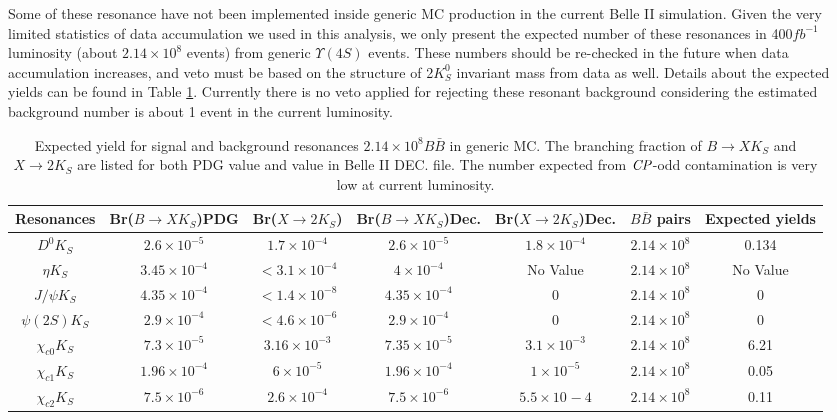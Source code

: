  Some of these resonance have not been implemented inside generic MC production in the current Belle II simulation. Given the very limited statistics of data accumulation we used in this analysis, we only present the expected number of these resonances in 400$fb^{-1}$ luminosity (about $2.14 \times 10^8$ events) from generic $\Upsilon{(4S)}$ events. These numbers should be re-checked in the future when data accumulation increases, and veto must be based on the structure of 2$K_S^0$ invariant mass from data as well. Details about the expected yields can be found in Table \ref{tab:f_res}. Currently there is no veto applied for rejecting these resonant background considering the estimated background number is about 1 event in the current luminosity.
\begin{table}
	\caption{Expected yield for signal and background resonances $2.14\times 10^8 B\bar{B}$ in generic MC. The branching fraction of $B\to X K_S$ and $X \to 2K_S$ are listed for both PDG value and value in Belle II DEC. file. The number expected from $\it{CP}$-odd contamination is very low at current luminosity.  }
	\label{tab:f_res}
	\centering
	\begin{tabular}{|c|c|c|c|c|c|c|}
		\hline
		Resonances & Br($B \to X K_S$)PDG  & Br($X \to2K_S$) & Br($B \to X K_S$)Dec. & Br($X \to2K_S$)Dec. & $B\bar{B}$ pairs & Expected yields \\
		\hline
		$D^0 K_S$ & $2.6 \times 10^{-5}$ & $1.7\times 10^{-4}$ & $2.6 \times 10^{-5}$ & $1.8\times 10^{-4}$ & $2.14\times 10^8$ & 0.134 \\
		\hline
		$\eta K_S$ & $3.45\times 10^{-4}$ & $<3.1\times 10^{-4}$ & $4\times 10^{-4}$ & No Value & $2.14\times 10^8$ & No Value  \\
		\hline
		$J/\psi K_S$ & $4.35\times 10^{-4}$ & $<1.4\times 10^{-8}$ & $4.35\times 10^{-4}$ & 0 & $2.14\times 10^8$ & 0 \\
		\hline
		$\psi(2S)K_S$ & $2.9\times 10^{-4}$ & $<4.6\times 10^{-6}$ & $2.9\times 10^{-4}$ & 0 & $2.14\times 10^8$ & 0 \\
		\hline
		$\chi_{c0}K_S$ & $7.3\times 10^{-5}$ & $3.16\times 10^{-3}$ & $7.35\times 10^{-5}$ & $3.1\times 10^{-3}$ & $2.14\times 10^8$ & 6.21 \\
		\hline
		$\chi_{c1}K_S$ & $1.96\times 10^{-4}$ & $6\times 10^{-5}$ & $1.96\times 10^{-4}$ & $1\times 10^{-5}$ & $2.14\times 10^8$ & 0.05 \\
		\hline
		$\chi_{c2}K_S$ & $7.5\times 10^{-6}$ & $2.6\times 10^{-4}$ & $7.5\times 10^{-6}$ & $5.5\times 10^{}-4$ & $2.14\times 10^8$ & 0.11 \\

\end{tabular}
\end{table}
